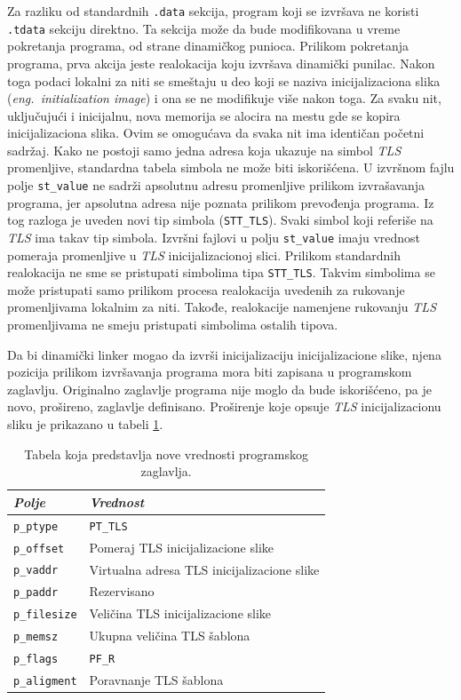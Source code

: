 \documentclass[12pt,oneside]{memoir}
\begin{document}
Za razliku od standardnih \texttt{.data} sekcija, program koji se izvršava ne koristi \texttt{.tdata} sekciju direktno.  Ta sekcija može da bude modifikovana u vreme pokretanja programa, od strane dinamičkog punioca. Prilikom pokretanja programa, prva akcija jeste realokacija koju izvršava dinamički punilac. Nakon toga podaci lokalni za niti se smeštaju u deo koji se naziva inicijalizaciona slika (\emph{eng.~initialization image}) i ona se ne modifikuje više nakon toga. Za svaku nit, uključujući i inicijalnu, nova memorija se alocira na mestu gde se kopira inicijalizaciona slika. Ovim se omogućava da svaka nit ima identičan početni sadržaj. Kako ne postoji samo jedna adresa koja ukazuje na simbol \emph{TLS} promenljive, standardna tabela simbola ne može biti iskorišćena. U izvršnom fajlu polje \texttt{st\_value} ne sadrži apsolutnu adresu promenljive prilikom izvrašavanja programa, jer apsolutna adresa nije poznata prilikom prevođenja programa. Iz tog razloga  je uveden novi tip simbola (\texttt{STT\_TLS}). Svaki simbol koji referiše na \emph{TLS} ima takav tip simbola. Izvršni fajlovi u polju \texttt{st\_value} imaju vrednost pomeraja promenljive u \emph{TLS} inicijalizacionoj slici.
Prilikom standardnih realokacija ne sme se pristupati simbolima tipa \texttt{STT\_TLS}. Takvim simbolima se može pristupati samo prilikom procesa realokacija uvedenih za rukovanje promenljivama lokalnim za niti. Takođe, realokacije namenjene rukovanju \emph{TLS} promenljivama ne smeju pristupati simbolima ostalih tipova.

Da bi dinamički linker mogao da izvrši inicijalizaciju inicijalizacione slike, njena pozicija prilikom izvršavanja programa mora biti zapisana u programskom zaglavlju. Originalno zaglavlje programa nije moglo da bude iskorišćeno, pa je novo, prošireno, zaglavlje definisano. Proširenje koje opsuje \emph{TLS} inicijalizacionu sliku je prikazano u tabeli \ref{tab:tls_prheader}.

\begin{table}
		\begin{center}
		\begin{tabular}{ | l | l |}
			\hline
			\emph{Polje} & \emph{Vrednost} \\ \hline
			\texttt{p\_ptype} & \texttt{PT\_TLS} \\ \hline
			\texttt{p\_offset} & Pomeraj TLS inicijalizacione slike  \\ \hline
			\texttt{p\_vaddr} & Virtualna adresa TLS inicijalizacione slike  \\ \hline
			\texttt{p\_paddr} & Rezervisano  \\ \hline
			\texttt{p\_filesize} & Veličina TLS inicijalizacione slike  \\ \hline
			\texttt{p\_memsz} & Ukupna veličina TLS šablona  \\ \hline
			\texttt{p\_flags} & \texttt{PF\_R}  \\ \hline
			\texttt{p\_aligment} & Poravnanje TLS šablona  \\ \hline
		\end{tabular}
	   \end{center}
		\caption{\label{tab:tls_prheader}Tabela koja predstavlja nove vrednosti programskog zaglavlja.}
\end{table}
\end{document}
